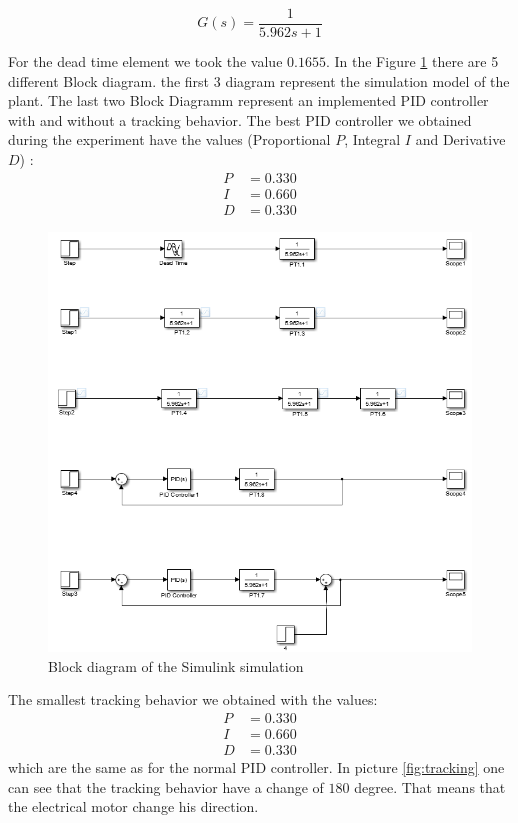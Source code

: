 \begin{equation}
    G(s) = \frac{1}{5.962s+1}
\end{equation}

For   the   dead  time  element  we  took   the   value   $0.1655$.   In  the Figure 
\ref{fig:simulink} there are 5 different Block diagram.  the  first  3 diagram
represent  the  simulation  model  of  the  plant. The last two Block Diagramm
represent an implemented PID controller with and without a tracking behavior.
The best PID controller we obtained during the experiment have the values (Proportional $P$, Integral $I$ and Derivative $D$) :
\begin{align*}
    P &= 0.330 \\
    I &= 0.660 \\
    D &= 0.330
\end{align*}

\begin{figure}
    \centering
    \includegraphics[width=\linewidth]{images/simulink.png}
    \caption{Block diagram of the Simulink simulation}
    \label{fig:simulink}
\end{figure}

The smallest tracking behavior we obtained with the values:
\begin{align*}
    P &= 0.330 \\
    I &= 0.660 \\
    D &= 0.330
\end{align*}
which are the same as for the normal PID controller. In picture \ref{fig:tracking} one can see that the tracking behavior have a change of $180$ degree. That means that the electrical motor change his direction.

